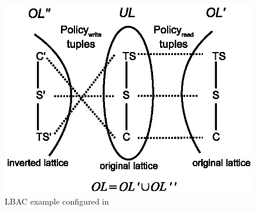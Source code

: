  \begin{figure}
 	\centering
 	\includegraphics[width=.5\textwidth]{ABAC16/lbac-labac-example}
 	\caption{LBAC example configured in \eapABAC{}}
 	\label{fig:lbac-labac-example}
 \end{figure}